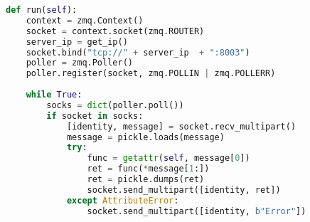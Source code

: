 \begin{lstlisting}[language=Python, 
                   caption = Examples code for ZMQRPC server., 
                   label=cap:zmqrpc_server]
def run(self):                                                                 
    context = zmq.Context()                                                    
    socket = context.socket(zmq.ROUTER)                                        
    server_ip = get_ip()                                                       
    socket.bind("tcp://" + server_ip  + ":8003")                               
    poller = zmq.Poller()                                                      
    poller.register(socket, zmq.POLLIN | zmq.POLLERR)                          
                                                                               
    while True:                                                                
        socks = dict(poller.poll())                                            
        if socket in socks:                                                    
            [identity, message] = socket.recv_multipart()                      
            message = pickle.loads(message)                                    
            try:                                                               
                func = getattr(self, message[0])                               
                ret = func(*message[1:])                                       
                ret = pickle.dumps(ret)                                        
                socket.send_multipart([identity, ret])                         
            except AttributeError:                                             
                socket.send_multipart([identity, b"Error"]) 
\end{lstlisting}

